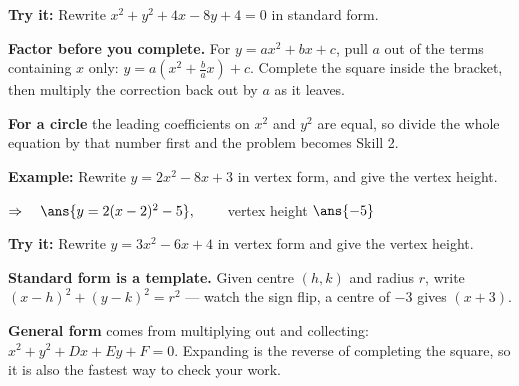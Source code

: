 \documentclass[12pt]{article}
\begin{document}
\begin{tryitbox}
\textbf{Try it:} \quad Rewrite $x^2 + y^2 + 4x - 8y + 4 = 0$ in standard form.\\[2pt]
\end{tryitbox}


\begin{formulabox}
\textbf{Factor before you complete.} For $y = ax^2 + bx + c$, pull $a$ out of the terms
containing $x$ only: $y = a(x^2 + \tfrac{b}{a}x) + c$. Complete the square inside the bracket,
then multiply the correction back out by $a$ as it leaves.\par
\textbf{For a circle} the leading coefficients on $x^2$ and $y^2$ are equal, so divide the
whole equation by that number first and the problem becomes Skill 2.
\end{formulabox}

\begin{examplebox}
\textbf{Example:} \quad Rewrite $y = 2x^2 - 8x + 3$ in vertex form, and give the vertex height.

$\Rightarrow\quad \ans{y = 2(x-2)^2 - 5}, \qquad$ vertex height $\ans{-5}$
\end{examplebox}

\begin{tryitbox}
\textbf{Try it:} \quad Rewrite $y = 3x^2 - 6x + 4$ in vertex form and give the vertex height.\\[2pt]
\end{tryitbox}


\begin{formulabox}
\textbf{Standard form is a template.} Given centre $(h,k)$ and radius $r$, write
$(x-h)^2 + (y-k)^2 = r^2$ --- watch the sign flip, a centre of $-3$ gives $(x+3)$.\par
\textbf{General form} comes from multiplying out and collecting:
$x^2 + y^2 + Dx + Ey + F = 0$. Expanding is the reverse of completing the square, so it is
also the fastest way to check your work.
\end{formulabox}
\end{document}
